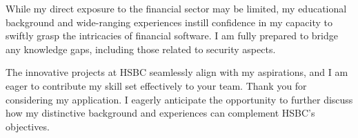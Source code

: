 \documentclass[11pt, a4paper]{awesome-cv}
\begin{document}
\begin{cvletter}
While my direct exposure to the financial sector may be limited, my educational background and wide-ranging experiences instill confidence in my capacity to swiftly grasp the intricacies of financial software. I am fully prepared to bridge any knowledge gaps, including those related to security aspects.

The innovative projects at HSBC seamlessly align with my aspirations, and I am eager to contribute my skill set effectively to your team. Thank you for considering my application. I eagerly anticipate the opportunity to further discuss how my distinctive background and experiences can complement HSBC's objectives.

\end{cvletter}


\makeletterclosing
\end{document}
